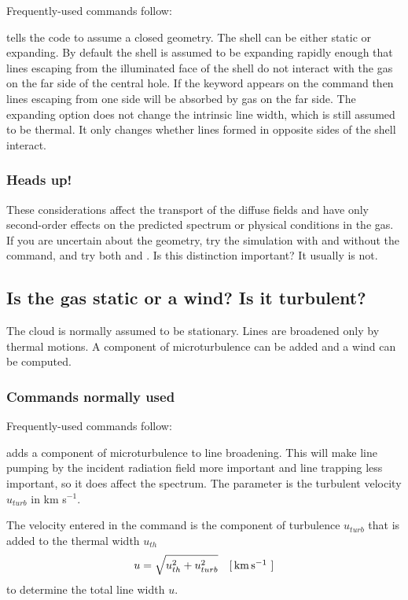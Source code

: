 \documentclass[12pt,twoside]{article}
\begin{document}
Frequently-used commands follow:

\label{command:sphere}
tells the code to assume a closed geometry.
The shell can be either static or expanding.  By default the shell is assumed
to be expanding rapidly enough that lines escaping from the illuminated
face of the shell do not interact with the gas on the far side of the central
hole.  If the  keyword appears
on the  command then lines
escaping from one side will be absorbed by gas on the far side.  The
expanding option does not change the intrinsic line width, which is still
assumed to be thermal.  It only changes whether lines formed in opposite
sides of the shell interact.

\subsubsection{Heads up!}

These considerations affect the transport of the diffuse fields and have
only second-order effects on the predicted spectrum or physical conditions
in the gas.  If you are uncertain about the geometry, try the simulation
with and without the  command,
and try both  and .  Is this distinction important?  It usually is not.

\subsection{Is the gas static or a wind?  Is it turbulent?}

The cloud is normally assumed to be stationary.  Lines are broadened
only by thermal motions.  A component of microturbulence can be added and
a wind can be computed.

\subsubsection{Commands normally used}

Frequently-used commands follow:

 adds a component of
microturbulence to line broadening.  This
will make line pumping by the incident radiation field more important and line
trapping less important, so it does affect the spectrum.  The parameter
is the turbulent velocity $u_\mathit{turb}$ in km s$^{-1}$.
\label{sec:TurbulenceWind}

The velocity entered in the 
command is the component of
turbulence $u_\mathit{turb}$ that is added to the thermal width $u_\mathit{th}$
\begin{equation}
u = \sqrt {u_{th}^2  + u_{turb}^2 }\quad \rm{[\mbox{${\rm\thinspace km}\mbox{${\rm\thinspace s}^{-1}\,$}\,$}]}
\end{equation}
to determine the total line width $u$.
\end{document}
